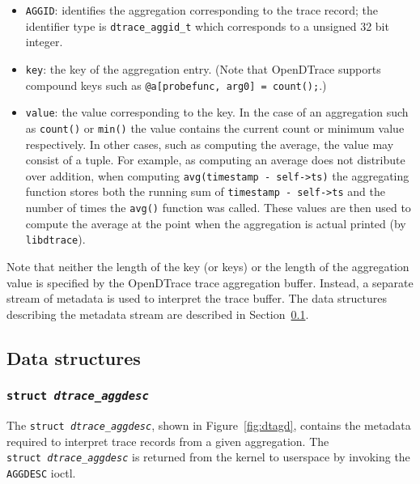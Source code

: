 \begin{itemize}

	\item{\texttt{AGGID}}: identifies the aggregation corresponding to the
trace record; the identifier type is \texttt{dtrace\_aggid\_t} which corresponds
to a unsigned 32 bit integer.

	\item{\texttt{key}:} the key of the aggregation entry. (Note that
OpenDTrace supports compound keys such as \texttt{@a[probefunc, arg0] = count();}.)

	\item{\texttt{value}:} the value corresponding to the key. In the case of
an aggregation such as \texttt{count()} or \texttt{min()} the value contains
the current count or minimum value respectively. In other cases, such as
computing the average, the value may consist of a tuple. For example, as
computing an average does not distribute over addition, when computing
\texttt{avg(timestamp - self->ts)} the aggregating function stores both the
running sum of \texttt{timestamp - self->ts} and the number of times the
\texttt{avg()} function was called. These values are then used to compute the
average at the point when the aggregation is actual printed (by \texttt{libdtrace}).

\end{itemize}

Note that neither the length of the key (or keys) or the length of the aggregation 
value is specified by the OpenDTrace trace aggregation buffer.
Instead, a separate stream of metadata is used to interpret the trace buffer.
The data structures describing the metadata stream are described in
Section~\ref{subsec:agg_data_structures}.

\subsection{Data structures}
\label{subsec:agg_data_structures}

\subsubsection{\texttt{struct~\textit{dtrace\_aggdesc}}}
\label{subsubsec:dtagd-aggdesc}

The \texttt{struct~\textit{dtrace\_aggdesc}}, shown in
Figure~\ref{fig:dtagd}, contains the metadata required to interpret trace
records from a given aggregation.  The
\texttt{struct~\textit{dtrace\_aggdesc}} is returned from the kernel
to userspace by invoking the \texttt{AGGDESC} ioctl.

